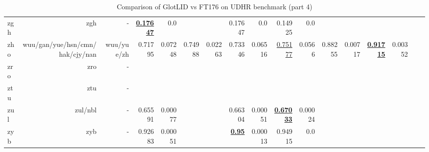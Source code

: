 \documentclass[11pt]{article}
\def\udhr{UDHR\xspace}
\def\ft176{FT176\xspace}
\begin{document}
\begin{table*}[h]
{\begin{tabular}{lrrrrrrrrrrrrrrrr}
zgh         & zgh         & -         & \textbf{\underline{0.17647}}         & 0.0         &          &          & 0.17647         & 0.0         & 0.14925         & 0.0         &          &          &          &          \\
zho         & wuu/gan/yue/hsn/cmn/hak/cjy/nan         & wuu/yue/zh         & 0.71795         & 0.07248         & 0.74988         & 0.02263         & 0.73346         & 0.06516         & \underline{0.75177}         & 0.0566         & 0.88255         & 0.00717         & \textbf{\underline{0.91715}}         & 0.00352         \\
zro         & zro         & -         &          &          &          &          &          &          &          &          &          &          &          &          \\
ztu         & ztu         & -         &          &          &          &          &          &          &          &          &          &          &          &          \\
zul         & zul/nbl         & -         & 0.65591         & 0.00077         &          &          & 0.66304         & 0.00051         & \textbf{\underline{0.67033}}         & 0.00024         &          &          &          &          \\
zyb         & zyb         & -         & 0.92683         & 0.00051         &          &          & \textbf{\underline{0.95}}         & 0.00013         & 0.94915         & 0.0         &          &          &          &          \\
\end{tabular}
}
\caption{Comparison of GlotLID vs \ft176 on \udhr benchmark (part 4)}
\label{tab:appendix_glotlid_ft176_udhr_4}
\end{table*}
 
\end{document}
